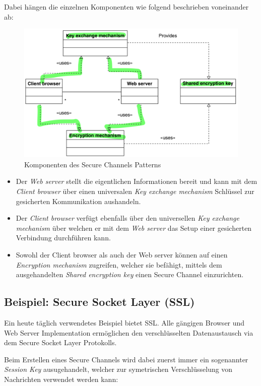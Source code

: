 Dabei hängen die einzelnen Komponenten wie folgend beschrieben voneinander ab:

\begin{figure}[H]
	\centering
	\includegraphics[width=12cm]{content/secure-internet-applications/images/secure-channels-overview.png}
	\caption{Komponenten des Secure Channels Patterns \cite{SecPatterns06}}
\end{figure}

\begin{itemize}
	\item Der \emph{Web server} stellt die eigentlichen Informationen bereit und kann mit dem \emph{Client browser} über einen universalen \emph{Key exchange mechanism} Schlüssel zur gesicherten Kommunikation aushandeln.
	\item Der \emph{Client browser} verfügt ebenfalls über den universellen \emph{Key exchange mechanism} über welchen er mit dem \emph{Web server} das Setup einer gesicherten Verbindung durchführen kann.
	\item Sowohl der Client browser als auch der Web server können auf einen \emph{Encryption mechanism} zugreifen, welcher sie befähigt, mittels dem ausgehandelten \emph{Shared encryption key} einen Secure Channel einzurichten.
\end{itemize}

\subsection*{Beispiel: Secure Socket Layer (SSL)}
Ein heute täglich verwendetes Beispiel bietet SSL. Alle gängigen Browser und Web Server Implementation ermöglichen den verschlüsselten Datenaustausch via dem Secure Socket Layer Protokolls.

Beim Erstellen eines Secure Channels wird dabei zuerst immer ein sogenannter \emph{Session Key} ausugehandelt, welcher zur symetrischen Verschlüsselung von Nachrichten verwendet werden kann:

